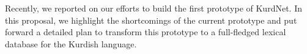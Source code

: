 Recently, we reported on our efforts to build the first prototype of KurdNet. In this proposal, we highlight the shortcomings of the current prototype and put forward a detailed plan to transform this prototype to a full-fledged lexical database for the Kurdish language.
